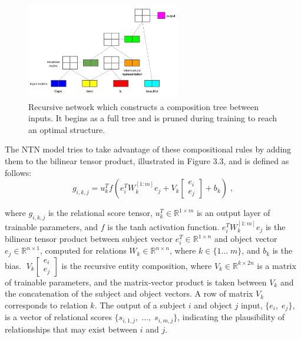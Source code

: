 \begin{figure}[H]
   	\centering
    	\includegraphics[width=0.6\textwidth, height=0.3\textwidth]{recursive_network.png}
	\caption{Recursive network which constructs a composition tree between inputs. It begins as a full tree and is pruned during training to reach an optimal structure.}
\end{figure}

\noindent The NTN model tries to take advantage of these compositional rules by adding them to the bilinear tensor product, illustrated in Figure 3.3, and is defined as follows:
\begin{equation}
	g_{i,k,j} =  u_k^Tf(e_i^TW_k^{\left [1:m \right ]} e_j + V_k \left [ \begin{matrix} e_i \\ e_j \end{matrix} \right ] + b_k) \; ,
\end{equation}

\noindent where $ g_{i,k,j} $ is the relational score tensor, $ u_k^T \in \mathbb{R}^{1 \times m} $ is an output layer of trainable parameters, and $ f $ is the tanh activation function. $ e_i^TW_k^{\left [1:m \right ]} e_j $ is the bilinear tensor product between subject vector $ e_i^T \in \mathbb{R}^{1 \times n} $ and object vector $ e_j \in \mathbb{R}^{n \times 1} $, computed for relations $ W_k \in \mathbb{R}^{n \times n} $, where $ k \in \{1 \dots \; m \} $, and $ b_k $ is the bias. $ \; V_k \left [ \begin{matrix} e_i \\ e_j \end{matrix} \right ] $ is the recursive entity composition, where $ V_k \in \mathbb{R}^{k \times 2n} $ is a matrix of trainable parameters, and the matrix-vector product is taken between $ V_k $ and the concatenation of the subject and object vectors. A row of matrix $ V_k $ corresponds to relation $ k $. The output of a subject $ i $ and object $ j $ input, $ \{ e_i, \; e_j \} $, is a vector of relational scores $ \{ s_{i,1,j}, \; \dots, \; s_{i,m,j} \} $, indicating the plausibility of relationships that may exist between $ i $ and $ j $. 

